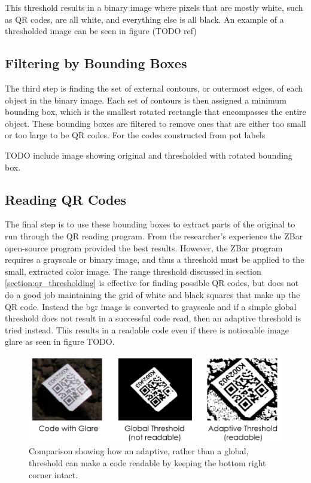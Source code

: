 This threshold results in a binary image where pixels that are mostly white, such as QR codes, are all white, and everything else is all black.  An example of a thresholded image can be seen in figure (TODO ref)

\subsection{Filtering by Bounding Boxes}

The third step is finding the set of external contours, or outermost edges, of each object in the binary image.  Each set of contours is then assigned a minimum bounding box, which is the smallest rotated rectangle that encompasses the entire object.  These bounding boxes are filtered to remove ones that are either too small or too large to be QR codes.  For the codes constructed from pot labels 

TODO include image showing original and thresholded with rotated bounding box. 

\subsection{Reading QR Codes}
\label{section:reading_codes}

The final step is to use these bounding boxes to extract parts of the original to run through the QR reading program.  From the researcher's experience the ZBar open-source program provided the best results.  However, the ZBar program requires a grayscale or binary image, and thus a threshold must be applied to the small, extracted color image.  The range threshold discussed in section \ref{section:qr_thresholding} is effective for finding possible QR codes, but does not do a good job maintaining the grid of white and black squares that make up the QR code.  Instead the \ac{bgr} image is converted to grayscale and if a simple global threshold does not result in a successful code read, then an adaptive threshold is tried instead.  This results in a readable code even if there is noticeable image glare as seen in figure TODO. 

\begin{figure}[htb]
	\centering
    \includegraphics[width=5.5in]{figures/adaptive_threshold.png}
    \caption[Adaptive threshold]{Comparison showing how an adaptive, rather than a global, threshold can make a code readable by keeping the bottom right corner intact.}
    \label{figure:adaptive_threshold}
\end{figure} 

